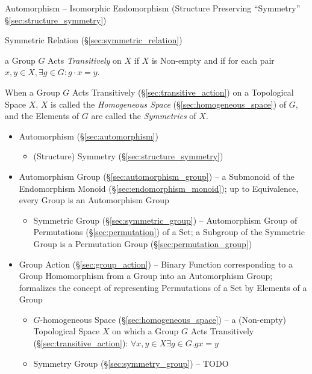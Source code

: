Automorphism -- Isomorphic Endomorphism
(Structure Preserving ``Symmetry'' \S\ref{sec:structure_symmetry})

Symmetric Relation (\S\ref{sec:symmetric_relation})

a Group $G$ Acts \emph{Transitively} on $X$ if $X$ is Non-empty and if for each
pair $x,y \in X, \exists g \in G : g \cdot x = y$.

When a Group $G$ Acts Transitively (\S\ref{sec:transitive_action}) on a
Topological Space $X$, $X$ is called the \emph{Homogeneous Space}
(\S\ref{sec:homogeneous_space}) of $G$, and the Elements of $G$ are called the
\emph{Symmetries} of $X$.

\begin{itemize}
  \item Automorphism (\S\ref{sec:automorphism})
    \begin{itemize}
      \item (Structure) Symmetry (\S\ref{sec:structure_symmetry})
    \end{itemize}
  \item Automorphism Group (\S\ref{sec:automorphism_group}) -- a Submonoid of
    the Endomorphism Monoid (\S\ref{sec:endomorphism_monoid}); up to
    Equivalence, every Group is an Automorphism Group
    \begin{itemize}
      \item Symmetric Group (\S\ref{sec:symmetric_group}) -- Automorphism Group
        of Permutations (\S\ref{sec:permutation}) of a Set; a Subgroup of the
        Symmetric Group is a Permutation Group (\S\ref{sec:permutation_group})
    \end{itemize}
  \item Group Action (\S\ref{sec:group_action}) -- Binary Function corresponding
    to a Group Homomorphism from a Group into an Automorphism Group; formalizes
    the concept of representing Permutations of a Set by Elements of a Group
    \begin{itemize}
      \item $G$-homogeneous Space (\S\ref{sec:homogeneous_space}) -- a
        (Non-empty) Topological Space $X$ on which a Group $G$ Acts
        Transitively (\S\ref{sec:transitive_action}):
        $\forall x,y \in X \exists g \in G . g x = y$
      \item Symmetry Group (\S\ref{sec:symmetry_group}) -- TODO
    \end{itemize}
\end{itemize}



